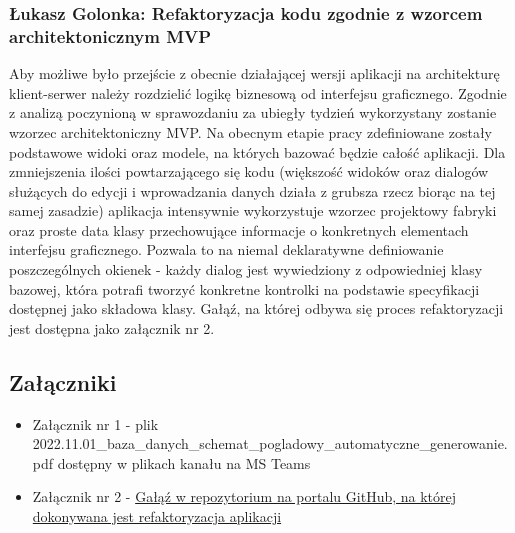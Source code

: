 \documentclass[12pt,a4paper,oneside]{article}
\theoremstyle{definition}
\numberwithin{equation}{section}
\begin{document}
\subsubsection{Łukasz Golonka: Refaktoryzacja kodu zgodnie z wzorcem architektonicznym MVP}
Aby możliwe było przejście z obecnie działającej wersji aplikacji na architekturę klient-serwer należy rozdzielić logikę biznesową od interfejsu graficznego.
Zgodnie z analizą poczynioną w sprawozdaniu za ubiegły tydzień wykorzystany zostanie wzorzec architektoniczny MVP.
Na obecnym etapie pracy zdefiniowane zostały podstawowe widoki oraz modele, na których bazować będzie całość aplikacji.
Dla zmniejszenia ilości powtarzającego się kodu (większość widoków oraz dialogów służących do edycji i wprowadzania danych działa z grubsza rzecz biorąc na tej samej zasadzie) aplikacja intensywnie wykorzystuje wzorzec projektowy fabryki oraz proste data klasy przechowujące informacje o konkretnych elementach interfejsu graficznego.
Pozwala to na niemal deklaratywne definiowanie poszczególnych okienek - każdy dialog jest wywiedziony z odpowiedniej klasy bazowej, która potrafi tworzyć konkretne kontrolki na podstawie specyfikacji dostępnej jako składowa klasy.
Gałąź, na której odbywa się proces refaktoryzacji jest dostępna jako załącznik nr 2.


\subsection{Załączniki}
\begin{itemize}
	\item Załącznik nr 1 - plik 2022.11.01\_baza\_danych\_schemat\_pogladowy\_automatyczne\_generowanie.pdf dostępny w plikach kanału na MS Teams
	\item Załącznik nr 2 - \href{https://github.com/lukaszgo1/engineering_project_2022/tree/mvp}{Gałąź w repozytorium na portalu GitHub, na której dokonywana jest refaktoryzacja aplikacji}
\end{itemize}
\end{document}
